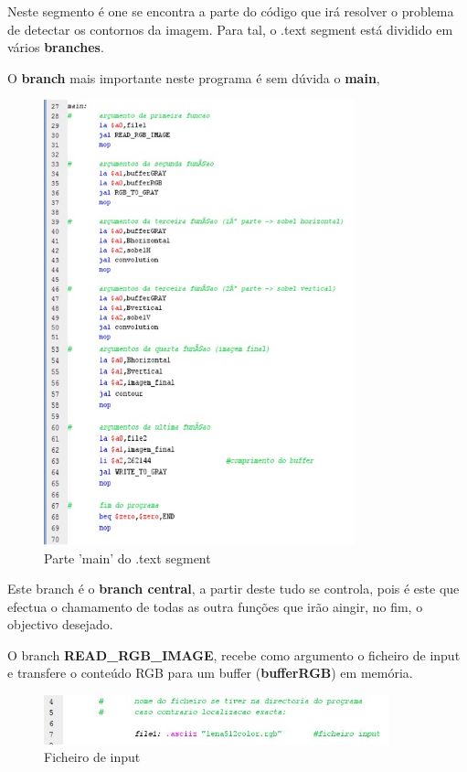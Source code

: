 \documentclass[a4paper,11pt]{article}
\begin{document}
\indent Neste segmento é one se encontra a parte do código que irá resolver o problema de detectar os contornos da imagem. Para tal, o .text segment está dividido em vários {\bf branches}.
\newline

O {\bf branch} mais importante neste programa é sem dúvida o {\bf main},

\begin{figure}[ht!]
\centering
\includegraphics[width=90mm]{imagem1}
\caption{Parte 'main' do .text segment}
\label{overflow}
\end{figure}

Este branch é o {\bf branch central}, a partir deste tudo se controla, pois é este que efectua o chamamento de todas as outra funções que irão aingir, no fim, o objectivo desejado.

\newpage

\newline
\newline
\indent O branch {\bf READ\_RGB\_IMAGE}, recebe como argumento o ficheiro de input e transfere o conteúdo RGB para um buffer ({\bf bufferRGB}) em memória.

\begin{figure}[ht!]
\centering
\includegraphics[width=100mm]{imagem2}
\caption{Ficheiro de input}
\label{overflow}
\end{figure}
\end{document}
